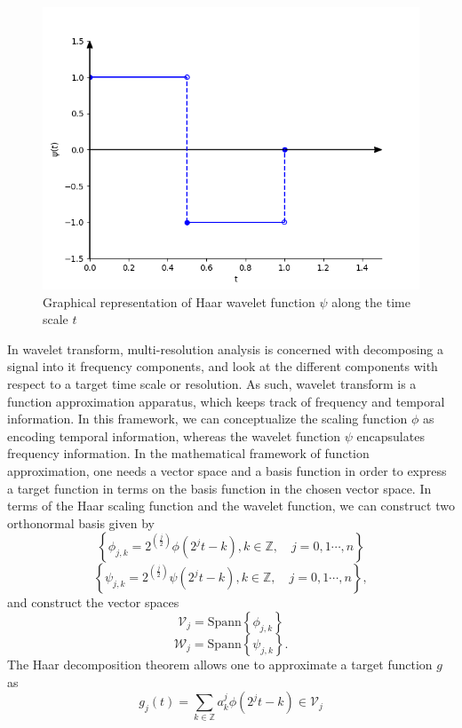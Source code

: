 \documentclass[../Main/thesis.tex]{subfiles}
\begin{document}
\begin{figure}[H] %
   \centering
   \includegraphics[width=5in]{../fig/haar-psi.png} 
   \caption{Graphical representation of Haar wavelet function $\psi$ along the time scale $t$}
   \label{fig:haar-psi}
\end{figure}
\clearpage
\justify
In wavelet transform, multi-resolution analysis is concerned with decomposing a signal into it frequency components, and look at the different components with respect to a target time scale or resolution. As such, wavelet transform is a function approximation apparatus, which keeps track of frequency and temporal information. In this framework, we can conceptualize the scaling function $\phi$ as encoding temporal information, whereas the wavelet function $\psi$ encapsulates frequency information. In the mathematical framework of function approximation, one needs a vector space and a basis function in order to express a target function in terms on the basis function in the chosen vector space.
\justify
In terms of the Haar scaling function and the wavelet function, we can construct two orthonormal basis given by 
\begin{equation}\label{eq:basis-phi}
\left\{\phi_{j,k} = 2^{\left(\frac{j}{2}\right)}\phi\left( 2^{j}t-k \right), k\in\mathbb{Z}, \quad j = 0,1 \cdots,n  \right\}
\end{equation}
\justify
\begin{equation}\label{eq:basis.psi}
\left\{\psi_{j,k} = 2^{\left(\frac{j}{2}\right)}\psi\left( 2^{j}t-k \right), k\in\mathbb{Z}, \quad j = 0,1 \cdots,n \right\},
\end{equation}
and construct the vector spaces
\begin{equation}
\mathcal{V}_{j} = \text{Spann}\left\{ \phi_{j,k}  \right\}
\end{equation}
\begin{equation}
\mathcal{W}_{j} = \text{Spann}\left\{ \psi_{j,k}  \right\}.
\end{equation}
The Haar decomposition theorem allows one to approximate a target function $g$ as
\begin{equation}
g_{j}(t) = \sum_{k\in\mathbb{Z}}a_{k}^{j}\phi\left(  2^{j}t-k\right)\in \mathcal{V}_{j}
\end{equation} 
\end{document}
